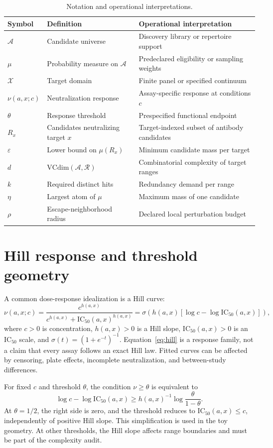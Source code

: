 \documentclass[11pt,a4paper]{article}
\newcommand{\Acal}{\mathcal A}
\newcommand{\Xcal}{\mathcal X}
\newcommand{\Rcal}{\mathcal R}
\newcommand{\eps}{\varepsilon}
\newcommand{\VC}{\mathrm{VCdim}}
\newcommand{\IC}{\mathrm{IC}_{50}}
\begin{document}
\begin{table}[t]\centering\small\caption{Notation and operational interpretations.}\begin{tabularx}{\linewidth}{p{.15\linewidth}X p{.30\linewidth}}\toprule Symbol&Definition&Operational interpretation\\\midrule $\Acal$&Candidate universe&Discovery library or repertoire support\\ $\mu$&Probability measure on $\Acal$&Predeclared eligibility or sampling weights\\ $\Xcal$&Target domain&Finite panel or specified continuum\\ $\nu(a,x;c)$&Neutralization response&Assay-specific response at conditions $c$\\ $\theta$&Response threshold&Prespecified functional endpoint\\ $R_x$&Candidates neutralizing target $x$&Target-indexed subset of antibody candidates\\ $\eps$&Lower bound on $\mu(R_x)$&Minimum candidate mass per target\\ $d$&$\VC(\Acal,\Rcal)$&Combinatorial complexity of target ranges\\ $k$&Required distinct hits&Redundancy demand per range\\ $\eta$&Largest atom of $\mu$&Maximum mass of one candidate\\ $\rho$&Escape-neighborhood radius&Declared local perturbation budget\\\bottomrule\end{tabularx}\label{tab:notation}\end{table}

\section{Hill response and threshold geometry}
A common dose-response idealization is a Hill curve:
\begin{equation}\nu(a,x;c)=\frac{c^{h(a,x)}}{c^{h(a,x)}+\IC(a,x)^{h(a,x)}}=\sigma\!\left(h(a,x)[\log c-\log\IC(a,x)]\right),\label{eq:hill}\end{equation}
where $c>0$ is concentration, $h(a,x)>0$ is a Hill slope, $\IC(a,x)>0$ is an IC$_{50}$ scale, and $\sigma(t)=(1+e^{-t})^{-1}$. Equation~\eqref{eq:hill} is a response family, not a claim that every assay follows an exact Hill law. Fitted curves can be affected by censoring, plate effects, incomplete neutralization, and between-study differences.

For fixed $c$ and threshold $\theta$, the condition $\nu\geq\theta$ is equivalent to
\begin{equation}\log c-\log\IC(a,x)\geq h(a,x)^{-1}\log\frac{\theta}{1-\theta}.\label{eq:hillthreshold}\end{equation}
At $\theta=1/2$, the right side is zero, and the threshold reduces to $\IC(a,x)\leq c$, independently of positive Hill slope. This simplification is used in the toy geometry. At other thresholds, the Hill slope affects range boundaries and must be part of the complexity audit.
\end{document}
